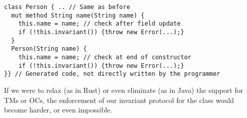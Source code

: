 
\begin{lstlisting}
class Person { .. // Same as before
  mut method String name(String name) {
    this.name = name; // check after field update
    if (!this.invariant()) {throw new Error(...);} 
  }
  Person(String name) {
    this.name = name; // check at end of constructor
    if (!this.invariant()) {throw new Error(...);}
}} // Generated code, not directly written by the programmer
\end{lstlisting}


\noindent If we were to relax (as in Rust) or even eliminate (as in Java) the support for TMs or OCs, the enforcement of our invariant protocol for the \Q@Person@ class would become harder, or even impossible. 

